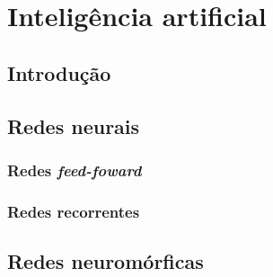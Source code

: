 \chapter{Inteligência artificial}\label{cap:ia}
\section{Introdução}\label{sec:ia_intro}

\section{Redes neurais}\label{sec:redesneurais}
\subsection{Redes \textit{feed-foward}}

\subsection{Redes recorrentes}

\section{Redes neuromórficas}\label{sec:redesneuromorficas}


